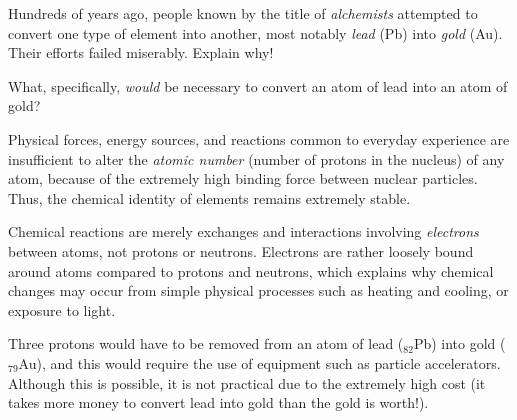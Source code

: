 

Hundreds of years ago, people known by the title of {\it alchemists} attempted to convert one type of element into another, most notably {\it lead} (Pb) into {\it gold} (Au).  Their efforts failed miserably.  Explain why!

\vskip 10pt

What, specifically, {\it would} be necessary to convert an atom of lead into an atom of gold?







Physical forces, energy sources, and reactions common to everyday experience are insufficient to alter the {\it atomic number} (number of protons in the nucleus) of any atom, because of the extremely high binding force between nuclear particles.  Thus, the chemical identity of elements remains extremely stable.

Chemical reactions are merely exchanges and interactions involving {\it electrons} between atoms, not protons or neutrons.  Electrons are rather loosely bound around atoms compared to protons and neutrons, which explains why chemical changes may occur from simple physical processes such as heating and cooling, or exposure to light.

\vskip 10pt

Three protons would have to be removed from an atom of lead ($_{82}$Pb) into gold ($_{79}$Au), and this would require the use of equipment such as particle accelerators.  Although this is possible, it is not practical due to the extremely high cost (it takes more money to convert lead into gold than the gold is worth!).











